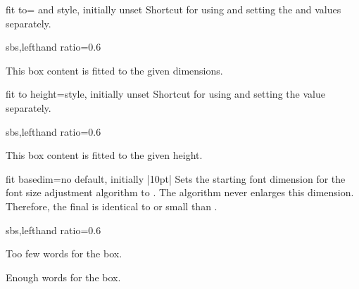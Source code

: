 
\begin{docTcbKey}{fit to}{= and }{style, initially unset}
  Shortcut for using  and setting the  and  values
  separately.
\begin{dispExample*}{sbs,lefthand ratio=0.6}

\begin{tcolorbox}[fit to=3cm and 2cm]
  This box content is fitted to the given
  dimensions.
\end{tcolorbox}
\end{dispExample*}
\end{docTcbKey}


\begin{docTcbKey}{fit to height}{=}{style, initially unset}
  Shortcut for using  and setting the  value separately.
\begin{dispExample*}{sbs,lefthand ratio=0.6}

\begin{tcolorbox}[fit to height=2cm]
  This box content is fitted to the given
  height.
\end{tcolorbox}
\end{dispExample*}
\end{docTcbKey}

\begin{docTcbKey}{fit basedim}{=}{no default, initially |10pt|}
  Sets the starting font dimension for the font size adjustment algorithm
  to . The algorithm never enlarges this dimension.
  Therefore, the final  is identical to or small than
  .

\begin{dispExample*}{sbs,lefthand ratio=0.6}

\begin{tcolorbox}[fit to=4cm and 2cm]
  Too few words for the box.
\end{tcolorbox}

\begin{tcolorbox}[fit to=4cm and 2cm,
  fit basedim=50pt]
  Enough words for the box.
\end{tcolorbox}
\end{dispExample*}
\end{docTcbKey}


